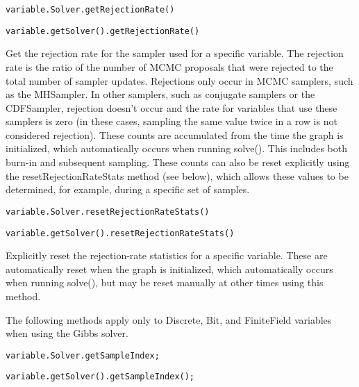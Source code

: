 \ifmatlab
\begin{lstlisting}
variable.Solver.getRejectionRate()
\end{lstlisting}
\fi

\ifjava
\begin{lstlisting}
variable.getSolver().getRejectionRate()
\end{lstlisting}
\fi

Get the rejection rate for the sampler used for a specific variable.  The rejection rate is the ratio of the number of MCMC proposals that were rejected to the total number of sampler updates.  Rejections only occur in MCMC samplers, such as the MHSampler.  In other samplers, such as conjugate samplers or the CDFSampler, rejection doesn't occur and the rate for variables that use these samplers is zero (in these cases, sampling the same value twice in a row is not considered rejection).  These counts are accumulated from the time the graph is initialized, which automatically occurs when running solve().  This includes both  burn-in and subsequent sampling.  These counts can also be reset explicitly using the resetRejectionRateStats method (see below), which allows these values to be determined, for example, during a specific set of samples.

\ifmatlab
\begin{lstlisting}
variable.Solver.resetRejectionRateStats()
\end{lstlisting}
\fi

\ifjava
\begin{lstlisting}
variable.getSolver().resetRejectionRateStats()
\end{lstlisting}
\fi

Explicitly reset the rejection-rate statistics for a specific variable.  These are automatically reset when the graph is initialized, which automatically occurs when running solve(), but may be reset manually at other times using this method.




The following methods apply only to Discrete, Bit, and FiniteField variables when using the Gibbs solver.

\ifmatlab
\begin{lstlisting}
variable.Solver.getSampleIndex;
\end{lstlisting}
\fi

\ifjava
\begin{lstlisting}
variable.getSolver().getSampleIndex();
\end{lstlisting}
\fi

